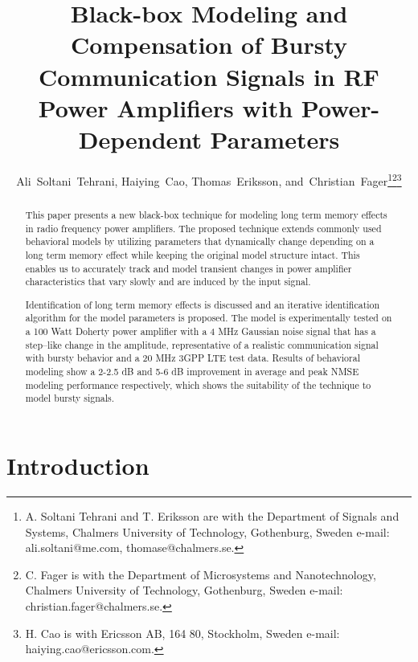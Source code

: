 \documentclass[journal]{IEEEtran}
\begin{document}
\title{Black-box Modeling and Compensation of Bursty Communication Signals in RF Power Amplifiers with Power-Dependent Parameters}


\author{Ali~Soltani~Tehrani,
        Haiying~Cao,
        Thomas~Eriksson,
        and~Christian~Fager\thanks{A. Soltani Tehrani and T. Eriksson are with the Department
of Signals and Systems, Chalmers University of Technology, Gothenburg,
Sweden e-mail: ali.soltani@me.com, thomase@chalmers.se.}\thanks{C. Fager is with the Department of Microsystems and Nanotechnology, Chalmers University of Technology, Gothenburg,
Sweden e-mail: christian.fager@chalmers.se.}\thanks{H. Cao is with Ericsson AB, 164 80, Stockholm,
Sweden e-mail: haiying.cao@ericsson.com.}}



\maketitle


\begin{abstract}
This paper presents a new black-box technique for modeling long term memory effects in radio frequency power amplifiers. The proposed technique extends commonly used behavioral models by utilizing parameters that dynamically change depending on a long term memory effect while keeping the original model structure intact. This enables us to accurately track and model transient changes in power amplifier characteristics that vary slowly and are induced by the input signal.

Identification of long term memory effects is discussed and an iterative identification algorithm for the model parameters is proposed. The model is experimentally tested on a 100 Watt Doherty power amplifier with a 4 MHz Gaussian noise signal that has a step--like change in the amplitude, representative of a realistic communication signal with bursty behavior and a 20 MHz 3GPP LTE test data. Results of behavioral modeling show a 2-2.5 dB and 5-6 dB improvement in average and peak NMSE modeling performance respectively, which shows the suitability of the technique to model bursty signals.
\end{abstract}






\IEEEpeerreviewmaketitle



\section{Introduction}
\end{document}

